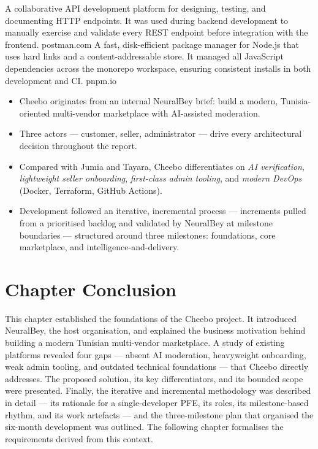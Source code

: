 \documentclass[12pt, a4paper, oneside]{report}
\newenvironment{keytakeaways}{%
  \par\bigskip
  \begin{mdframed}[
    backgroundcolor=cheebolightgray,
    linecolor=cheeboblue,
    linewidth=3pt,
    topline=false,
    bottomline=false,
    rightline=false,
    innerleftmargin=14pt,
    innerrightmargin=14pt,
    innertopmargin=10pt,
    innerbottommargin=10pt
  ]
  \noindent{\bfseries\color{cheeboblue}\large Key Takeaways}\par
  \vspace{4pt}
  \small
}{%
  \end{mdframed}
}
\begin{document}
\noindent
{}
  {A collaborative API development platform for designing, testing, and documenting
   HTTP endpoints. It was used during backend development to manually exercise and
   validate every REST endpoint before integration with the frontend.}
  {postman.com}
\hfill
{}
  {A fast, disk-efficient package manager for Node.js that uses hard links and a
   content-addressable store. It managed all JavaScript dependencies across the
   monorepo workspace, ensuring consistent installs in both development and CI.}
  {pnpm.io}

\begin{keytakeaways}
\begin{itemize}[leftmargin=*,itemsep=2pt]
  \item Cheebo originates from an internal NeuralBey brief: build a
        modern, Tunisia-oriented multi-vendor marketplace with
        AI-assisted moderation.
  \item Three actors --- customer, seller, administrator --- drive
        every architectural decision throughout the report.
  \item Compared with Jumia and Tayara, Cheebo differentiates on
        \emph{AI verification}, \emph{lightweight seller onboarding},
        \emph{first-class admin tooling}, and \emph{modern DevOps}
        (Docker, Terraform, GitHub Actions).
  \item Development followed an iterative, incremental process ---
        increments pulled from a prioritised backlog and validated by
        NeuralBey at milestone boundaries --- structured around three
        milestones: foundations, core marketplace, and
        intelligence-and-delivery.
\end{itemize}
\end{keytakeaways}

\section*{Chapter Conclusion}

This chapter established the foundations of the Cheebo project. It
introduced NeuralBey, the host organisation, and explained the
business motivation behind building a modern Tunisian multi-vendor
marketplace. A study of existing platforms revealed four gaps ---
absent AI moderation, heavyweight onboarding, weak admin tooling, and
outdated technical foundations --- that Cheebo directly addresses.
The proposed solution, its key differentiators, and its bounded scope
were presented. Finally, the iterative and incremental methodology was
described in detail --- its rationale for a single-developer PFE, its
roles, its milestone-based rhythm, and its work artefacts --- and the
three-milestone plan that organised the six-month development was
outlined. The following chapter formalises the requirements
derived from this context.
\end{document}
